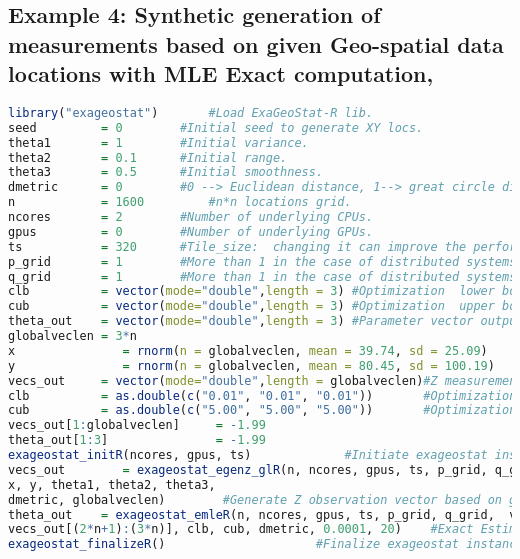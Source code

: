 \documentclass[
10pt, %
a4paper, %
oneside, %
headinclude,footinclude, %
BCOR5mm, %
]{scrartcl}
\begin{document}
\subsection{Example 4: Synthetic generation of measurements based on given Geo-spatial data locations with MLE Exact computation,}
\begin{lstlisting}[language=R]
library("exageostat") 		#Load ExaGeoStat-R lib.
seed         = 0 		#Initial seed to generate XY locs.
theta1       = 1 		#Initial variance.
theta2       = 0.1 		#Initial range.
theta3       = 0.5 		#Initial smoothness.
dmetric      = 0 		#0 --> Euclidean distance, 1--> great circle distance.
n            = 1600 		#n*n locations grid.
ncores       = 2 		#Number of underlying CPUs.
gpus         = 0 		#Number of underlying GPUs.
ts           = 320 		#Tile_size:  changing it can improve the performance. 
p_grid       = 1 		#More than 1 in the case of distributed systems.
q_grid       = 1 		#More than 1 in the case of distributed systems.
clb          = vector(mode="double",length = 3) #Optimization  lower bounds values.
cub          = vector(mode="double",length = 3) #Optimization  upper bounds values.
theta_out    = vector(mode="double",length = 3) #Parameter vector output.
globalveclen = 3*n
x               = rnorm(n = globalveclen, mean = 39.74, sd = 25.09)     #X dimension vector of n locations.
y               = rnorm(n = globalveclen, mean = 80.45, sd = 100.19)    #Y dimension vector of n locations.
vecs_out     = vector(mode="double",length = globalveclen)#Z measurements of n locations.
clb          = as.double(c("0.01", "0.01", "0.01")) 	  #Optimization lower bounds.
cub          = as.double(c("5.00", "5.00", "5.00"))  	  #Optimization upper bounds.
vecs_out[1:globalveclen]     = -1.99
theta_out[1:3]               = -1.99
exageostat_initR(ncores, gpus, ts) 			   #Initiate exageostat instance.
vecs_out        = exageostat_egenz_glR(n, ncores, gpus, ts, p_grid, q_grid,
x, y, theta1, theta2, theta3, 
dmetric, globalveclen) 		  #Generate Z observation vector based on given locations.
theta_out    = exageostat_emleR(n, ncores, gpus, ts, p_grid, q_grid,  vecs_out[1:n],  vecs_out[n+1:(2*n)],
vecs_out[(2*n+1):(3*n)], clb, cub, dmetric, 0.0001, 20)    #Exact Estimation (MLE).
exageostat_finalizeR() 					   #Finalize exageostat instance
\end{lstlisting}



%


\end{document}
